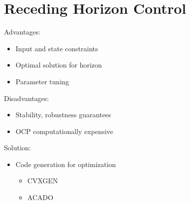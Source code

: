 \ETHslide
\section*{Receding Horizon Control}
\vspace*{\fill}

Advantages:
\begin{itemize}
\item[\ETHitem] Input and state constraints
\item[\ETHitem] Optimal solution for horizon
\item[\ETHitem] Parameter tuning
\end{itemize}
Disadvantages:
\begin{itemize}
\item[\ETHitem] Stability, robustness guarantees
\item[\ETHitem] OCP computationally expensive
\end{itemize}
Solution:
\begin{itemize}
\item[\ETHitem] Code generation for optimization
\begin{itemize}
\item[\ETHitem] CVXGEN
\item[\ETHitem] ACADO
\end{itemize}
\end{itemize}
\vspace*{\fill}
\clearpage